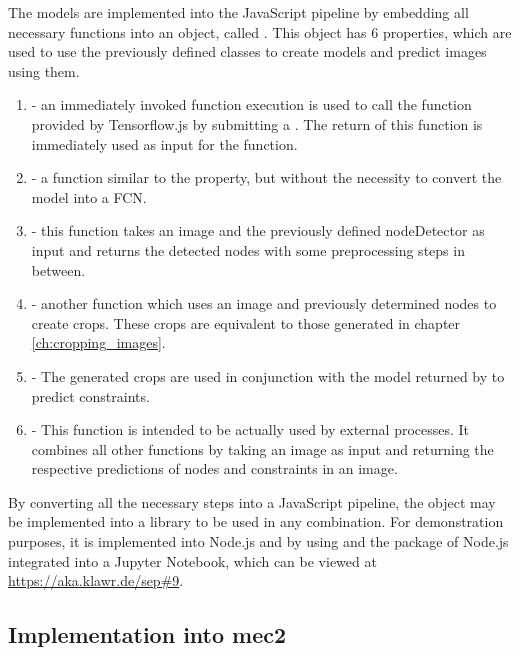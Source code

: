The models are implemented into the JavaScript pipeline by embedding all necessary functions into an object, called .
This object has 6 properties, which are used to use the previously defined classes to create models and predict images using them.

\begin{enumerate}
    \item {} - an immediately invoked function execution is used to call the  function provided by Tensorflow.js by submitting a .
    The return of this function is immediately used as input for the  function.
    \item {} - a function similar to the  property, but without the necessity to convert the model into a FCN.
    \item {} - this function takes an image and the previously defined nodeDetector as input and returns the detected nodes with some preprocessing steps in between.
    \item {} - another function which uses an image and previously determined nodes to create crops. These crops are equivalent to those generated in chapter \ref{ch:cropping_images}.
    \item {} - The generated crops are used in conjunction with the model returned by  to predict constraints.
    \item {} - This function is intended to be actually used by external processes.
    It combines all other functions by taking an image as input and returning the respective predictions of nodes and constraints in an image.
\end{enumerate}

By converting all the necessary steps into a JavaScript pipeline, the  object may be implemented into a library to be used in any combination.
For demonstration purposes, it is implemented into Node.js %
and by using  and the  package of Node.js %
integrated into a Jupyter Notebook, which can be viewed at \url{https://aka.klawr.de/sep\#9}.

\subsection{Implementation into mec2}

